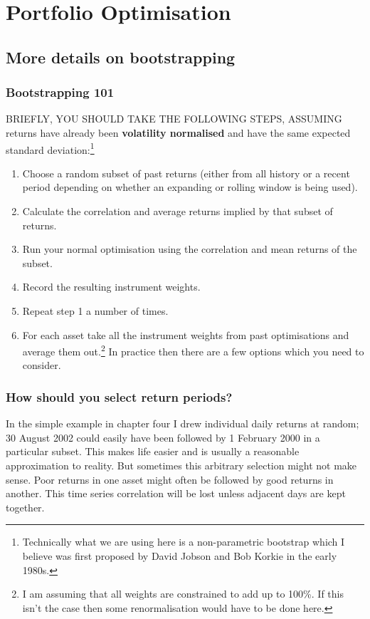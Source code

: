 \chapter{Portfolio Optimisation}

\section*{More details on bootstrapping}  {}

\subsection*{Bootstrapping 101}

BRIEFLY, YOU SHOULD TAKE THE FOLLOWING STEPS, ASSUMING returns have already been \textbf{volatility normalised} and have the same expected standard deviation:\footnote{Technically what we are using here is a non-parametric bootstrap which I believe was first proposed by David Jobson and Bob Korkie in the early 1980s.}

\begin{enumerate}
\item Choose a random subset of past returns (either from all history or a recent period depending on whether an expanding or rolling window is being used).
\item Calculate the correlation and average returns implied by that subset of returns.
\item Run your normal optimisation using the correlation and mean returns of the subset.
\item Record the resulting instrument weights.
\item Repeat step 1 a number of times.
\item For each asset take all the instrument weights from past optimisations and average them out.\footnote{I am assuming that all weights are constrained to add up to 100\%. If this isn't the case then some renormalisation would have to be done here.} In practice then there are a few options which you need to consider. \end{enumerate}

\subsection*{How should you select return periods?}

In the simple example in chapter four I drew individual daily returns at random; 30 August 2002 could easily have been followed by 1 February 2000 in a particular subset. This makes life easier and is usually a reasonable approximation to reality. But sometimes this arbitrary selection might not make sense. Poor returns in one asset might often be followed by good returns in another. This time series correlation will be lost unless adjacent days are kept together.

